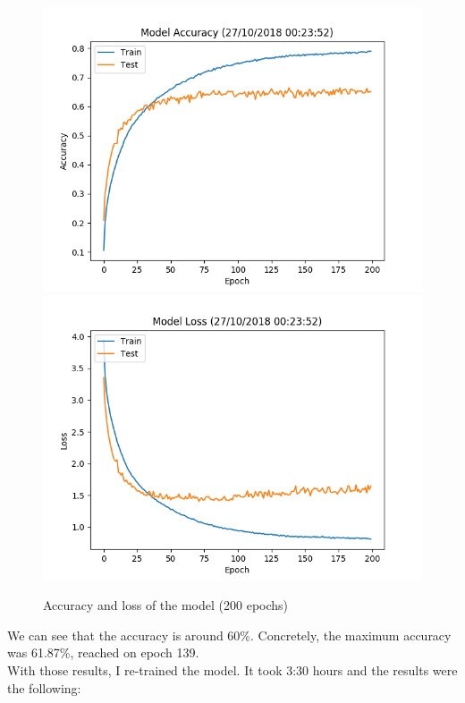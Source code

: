 \documentclass[12pt,english]{article}
\begin{document}
\begin{figure}[H]
\centering
\includegraphics[scale=0.85]{accuracy.png}
\includegraphics[scale=0.85]{loss.png}
\caption{Accuracy and loss of the model (200 epochs)}
\end{figure}

We can see that the accuracy is around 60\%. Concretely, the maximum accuracy was 61.87\%, reached on epoch 139.\\

With those results, I re-trained the model. It took 3:30 hours and the results were the following:
\end{document}
